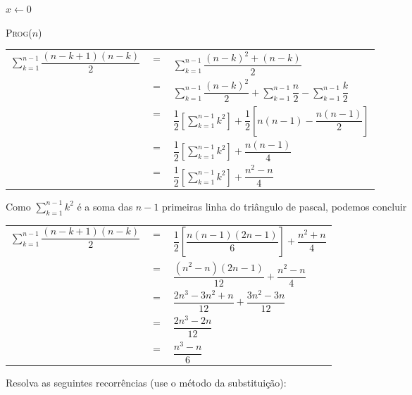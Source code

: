 \documentclass[a4paper]{exam}
\begin{document}
\begin{questions}
\begin{algorithm}[H]
    $x \gets 0$\;
    \caption{\textsc{Prog}($n$)}
  \end{algorithm}
  \begin{solution}
    \begin{tabular}{lll}
      $ \displaystyle\sum_{k=1}^{n-1} \dfrac{(n-k+1)(n-k)}{2} $&  $=$ &$ \displaystyle\sum_{k=1}^{n-1} \dfrac{(n-k)^2 + (n-k)}{2} $\\
      {}& $=$ &$ \displaystyle\sum_{k=1}^{n-1} \dfrac{(n-k)^2}{2} + \displaystyle\sum_{k=1}^{n-1}  \dfrac{n}{2} - \displaystyle\sum_{k=1}^{n-1} \dfrac{k}{2} $ \\
      {}& $=$ &$ \dfrac{1}{2}\left[ \displaystyle\sum_{k=1}^{n-1} k ^2 \right] + \dfrac{1}{2} \left[ n(n-1) - \dfrac{n(n-1)}{2} \right]  $\\ 
      {}& $=$ &$ \dfrac{1}{2} \left[ \displaystyle\sum_{k=1}^{n-1} k^2 \right] + \dfrac{n(n-1)}{4} $\\
      {}& $=$ &$ \dfrac{1}{2} \left[ \displaystyle\sum_{k=1}^{n-1} k^2 \right] + \dfrac{n^2 -n}{4} $\\
    \end{tabular}

      Como $\displaystyle\sum_{k=1}^{n-1} k^2 $ é a soma das $n-1$  primeiras linha do triângulo de pascal, podemos concluir

    \begin{tabular}{lll}
      $\displaystyle\sum_{k=1}^{n-1} \dfrac{(n-k+1)(n-k)}{2}$& $=$ &$\dfrac{1}{2} \left[ \dfrac{n(n-1)(2n-1)}{6}\right] + \dfrac{n^2 + n}{4} $\\
      {}& $=$ &$ \dfrac{(n^2 -n)(2n-1)}{12} + \dfrac{n^2 - n}{4}  $\\
      {}& $=$ &$ \dfrac{2n^3 - 3n^2 + n}{12} + \dfrac{3n^2 - 3n}{12}$\\
      {}& $=$ &$ \dfrac{2n^3- 2n}{12} $\\
      {}& $=$ &$ \dfrac{n^3 -n}{6} $\\
    \end{tabular}
  \end{solution}
  \question Resolva as seguintes recorrências (use o método da
  substituição):
\end{questions}
\end{document}

